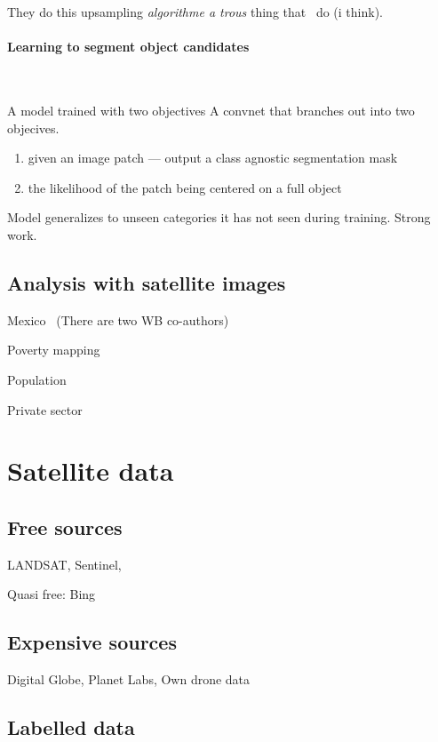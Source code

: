 \documentclass[12pt, a4paper, oneside, headinclude, footinclude]{article}
\begin{document}
They do this upsampling \textit{algorithme a trous} thing that~\cite{NIPS2015_5852}
do (i think).

\paragraph{Learning to segment object candidates}~\cite{NIPS2015_5852}

A model trained with two objectives
A convnet that branches out into two objecives.

\begin{enumerate}
    \item given an image patch ---  output a class agnostic segmentation mask
    \item the likelihood of the patch being centered on a full object
\end{enumerate}

Model generalizes to unseen categories it has not seen during training. Strong
work.



\subsection{Analysis with satellite images}

Mexico~\cite{babenko2017poverty} (There are two WB co-authors)

Poverty mapping~\cite{Jean790}

Population~\cite{doupe2016, robinson2017}

Private sector~\cite{facebook, cnn_orbital}

\section{Satellite data}

\subsection{Free sources}

LANDSAT, Sentinel, 

Quasi free: Bing

\subsection{Expensive sources}

Digital Globe, Planet Labs, Own drone data

\subsection{Labelled data}
\end{document}
